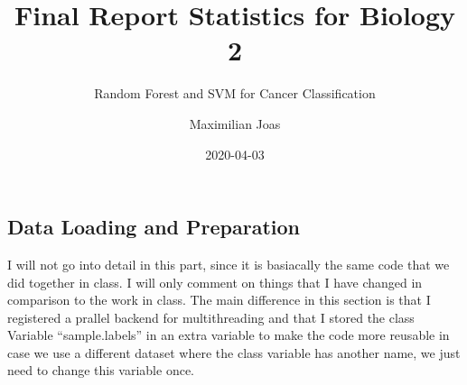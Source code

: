 \documentclass[]{article}
\title{Final Report Statistics for Biology 2}
\subtitle{Random Forest and SVM for Cancer Classification}
\author{Maximilian Joas}
\date{2020-04-03}
\begin{document}
\maketitle

{
\setcounter{tocdepth}{3}
\tableofcontents
}
\hypertarget{data-loading-and-preparation}{%
\subsection{Data Loading and
Preparation}\label{data-loading-and-preparation}}

I will not go into detail in this part, since it is basiacally the same
code that we did together in class. I will only comment on things that I
have changed in comparison to the work in class. The main difference in
this section is that I registered a prallel backend for multithreading
and that I stored the class Variable ``sample.labels'' in an extra
variable to make the code more reusable in case we use a different
dataset where the class variable has another name, we just need to
change this variable once.
\end{document}
